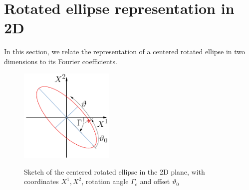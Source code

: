 \documentclass[12pt]{iopart}
\newcommand\hladdedrev[1]{#1} %
\newcommand{\thet}{\vartheta}
\begin{document}
\section{\hladdedrev{Rotated ellipse representation in 2D}\label{app:ellipse}}
\newcommand\rotangle{{\Gamma_e}}
\hladdedrev{
In this section, we relate the representation of a centered rotated ellipse in two dimensions to its Fourier coefficients.}
\begin{figure}[htbp!]
    \centering
    \includegraphics[width=0.4\textwidth]{pics/rotated_ellipse_corrected.pdf}\\
    \caption{\hladdedrev{Sketch of the centered rotated ellipse in the 2D plane, with coordinates $X^1,X^2$, rotation angle $\rotangle$ and offset $\thet_0$}}\label{fig:rotated_ellipse}
    \end{figure}
\end{document}
